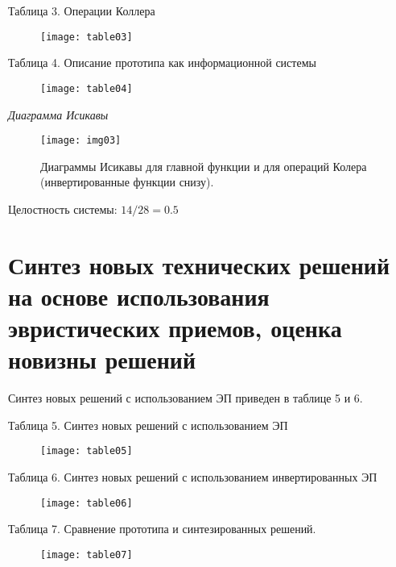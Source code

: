 Таблица 3. Операции Коллера
\begin{figure}[h!]
    \center
    \texttt{[image: table03]}
\end{figure}

\pagebreak

Таблица 4. Описание прототипа как информационной системы
\begin{figure}[h!]
    \center
    \texttt{[image: table04]}
\end{figure}

\vspace{-1em}\emph{Диаграмма Исикавы}
\begin{figure}[h!]
    \center
    \texttt{[image: img03]}
    \caption{Диаграммы Исикавы для главной функции и для операций Колера (инвертированные функции снизу).}
\end{figure}

Целостность системы: \( 14 / 28 = 0.5 \)

\chapter{Синтез новых технических решений на основе использования эвристических приемов, 
    оценка новизны решений}
Синтез новых решений с использованием ЭП приведен в таблице 5 и 6.

Таблица 5. Синтез новых решений с использованием ЭП
\begin{figure}[h!]
    \center
    \texttt{[image: table05]}
\end{figure}

\pagebreak

Таблица 6. Синтез новых решений с использованием инвертированных ЭП
\begin{figure}[h!]
    \center
    \texttt{[image: table06]}
\end{figure}

\pagebreak

Таблица 7. Сравнение прототипа и синтезированных решений. 
\begin{figure}[h!]
    \center
    \texttt{[image: table07]}
\end{figure}

